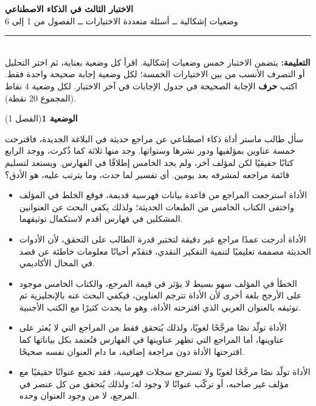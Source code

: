 \documentclass[11pt,a4paper]{article}
\begin{document}
\linespread{1.08}\selectfont
\begin{center}
{\LARGE\khatt\textbf{الاختبار الثالث في الذكاء الاصطناعي}}\\[4pt]
{\normalsize وضعيات إشكالية ــ أسئلة متعددة الاختيارات ــ الفصول من 1 إلى 6}
\end{center}
\vspace{-2pt}\rule{\textwidth}{0.6pt}\\[2pt]
\textbf{التعليمة:} يتضمن الاختبار خمس وضعيات إشكالية. اقرأ كل وضعية بعناية، ثم اختر التحليل أو التصرف الأنسب
من بين الاختيارات الخمسة؛ لكل وضعية إجابة صحيحة واحدة فقط.
اكتب \textbf{حرف} الإجابة الصحيحة في جدول الإجابات في آخر الاختبار.
لكل وضعية 4 نقاط (المجموع 20 نقطة).
\vspace{4pt}

\noindent
{\large\khatt\textbf{الوضعية 1}}\hfill{\small(الفصل 1)}\par\nopagebreak\vspace{3pt}
\setlength{\fboxsep}{7pt}\colorbox{gray!10}{\parbox{\dimexpr\linewidth-14pt}{سأل طالب ماستر أداة ذكاء اصطناعي عن مراجع حديثة في البلاغة الجديدة، فاقترحت خمسة عناوين بمؤلفيها ودور نشرها وسنواتها. وجد منها ثلاثة كما ذُكرت، ووجد الرابع كتابًا حقيقيًا لكن لمؤلف آخر، ولم يجد الخامس إطلاقًا في الفهارس. ويستعد لتسليم قائمة مراجعه لمشرفه بعد يومين. أي تفسير لما حدث، وما يترتب عليه، هو الأدق؟}}\par\nopagebreak
\begin{itemize}[leftmargin=1.0cm, labelsep=6pt, itemsep=3pt, topsep=4pt, parsep=0pt]
  \item[\textbf{أ)}] الأداة استرجعت المراجع من قاعدة بيانات فهرسية قديمة، فوقع الخلط في المؤلف واختفى الكتاب الخامس من الطبعات الحديثة؛ ولذلك يكفي البحث عن العنوانين المشكلين في فهارس أقدم لاستكمال توثيقهما.
  \item[\textbf{ب)}] الأداة أدرجت عمدًا مراجع غير دقيقة لتختبر قدرة الطالب على التحقق، لأن الأدوات الحديثة مصممة تعليميًا لتنمية التفكير النقدي، فتقدّم أحيانًا معلومات خاطئة عن قصد في المجال الأكاديمي.
  \item[\textbf{ج)}] الخطأ في المؤلف سهو بسيط لا يؤثر في قيمة المرجع، والكتاب الخامس موجود على الأرجح بلغة أخرى لأن الأداة تترجم العناوين، فيكفي البحث عنه بالإنجليزية ثم توثيقه بالعنوان العربي الذي اقترحته الأداة، وهو ما يحدث كثيرًا مع الكتب الأجنبية.
  \item[\textbf{د)}] الأداة تولّد نصًا مرجَّحًا لغويًا، ولذلك يُتحقق فقط من المراجع التي لا يُعثر على عناوينها، أما المراجع التي تظهر عناوينها في الفهارس فتُعتمد بكل بياناتها كما اقترحتها الأداة دون مراجعة إضافية، ما دام العنوان نفسه صحيحًا.
  \item[\textbf{هـ)}] الأداة تولّد نصًا مرجَّحًا لغويًا ولا تسترجع سجلات فهرسية، فقد تجمع عنوانًا حقيقيًا مع مؤلف غير صاحبه، أو تركّب عنوانًا لا وجود له؛ ولذلك يُتحقق من كل عنصر في المرجع، لا من وجود العنوان وحده.
\end{itemize}
\end{document}
